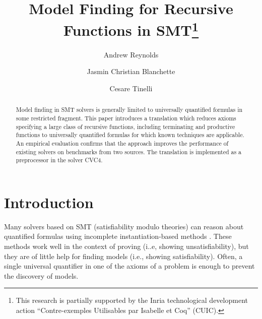 \documentclass[runningheads,a4paper]{llncs}
\newcommand\cvc{CVC4\xspace}
\newcommand{\rem}[1]{\textcolor{red}{[#1]}}
\newcommand{\ct}[1]{\rem{#1 --ct}}
\begin{document}
\title{Model Finding for Recursive Functions in SMT\thanks{%
This research is partially supported by the Inria technological development
action ``Contre-exemples Utilisables par Isabelle et Coq'' (CUIC).
}
}

\author {Andrew Reynolds \and Jasmin Christian Blanchette \and Cesare Tinelli }

\maketitle

\begin{abstract}
Model finding in SMT solvers is
generally limited to universally quantified formulas in some restricted fragment.
This paper introduces a translation which reduces axioms specifying a large
class of recursive functions, including terminating and
productive functions to universally quantified formulas for which known
techniques are applicable.
An empirical evaluation confirms that the approach improves 
the performance of existing solvers on benchmarks from two sources. 
The translation is implemented as a preprocessor in the solver CVC4.
\end{abstract}

\setcounter{footnote}{0}

\section{Introduction}
\label{sec:introduction}


Many solvers based on SMT (satisfiability modulo theories) can reason about
quantified formulas using incomplete instantiation-based methods
\cite{MouraBjoerner07,ReynoldsTinelliMoura14}.
These methods work well in the context of proving (i..e, showing
unsatisfiability), but they are of little help for finding models (i.e.,
showing satisfiability). Often, a single universal quantifier in one of the
axioms of a problem is enough to prevent the discovery of models.
\end{document}
